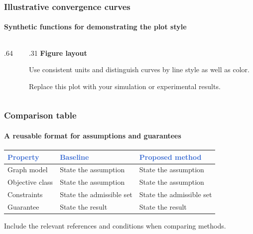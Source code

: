 \documentclass[10pt,aspectratio=169]{dgist_beamer}
\begin{document}
\begin{frame}
  \frametitle{Illustrative convergence curves}
  \framesubtitle{Synthetic functions for demonstrating the plot style}
  \begin{columns}[c,onlytextwidth]
    \begin{column}{.64\textwidth}
      \centering
    \end{column}
    \begin{column}{.31\textwidth}
      \textbf{Figure layout}\par\medskip
      Use consistent units and distinguish curves by line style as well as color.
      \par\bigskip
      Replace this plot with your simulation or experimental results.
    \end{column}
  \end{columns}
\end{frame}

\begin{frame}
  \frametitle{Comparison table}
  \framesubtitle{A reusable format for assumptions and guarantees}
  \renewcommand{\arraystretch}{1.55}
  \begin{center}
    \begin{tabular}{@{}p{}p{}p{}@{}}
      \toprule
      \textcolor{highlight}{\textbf{Property}} &
      \textcolor{highlight}{\textbf{Baseline}} &
      \textcolor{highlight}{\textbf{Proposed method}}\\
      \midrule
      Graph model & State the assumption & State the assumption\\
      Objective class & State the assumption & State the assumption\\
      Constraints & State the admissible set & State the admissible set\\
      Guarantee & State the result & State the result\\
      \bottomrule
    \end{tabular}
  \end{center}
  \vspace{.25cm}
  Include the relevant references and conditions when comparing methods.
\end{frame}
\end{document}
